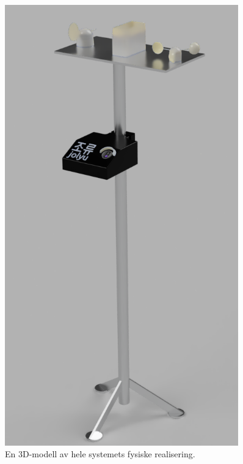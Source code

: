 \begin{figure}[!htbp]
\begin{minipage}[c]{0.45\textwidth}
\end{minipage}
\begin{minipage}[c]{0.45\textwidth}
\centering
    \includegraphics[width=0.9\textwidth]{implementering/stativ_render.png}
    \caption{En 3D-modell av hele systemets fysiske realisering.}
    \label{fig:3dsystem}
\end{minipage}
\end{figure}